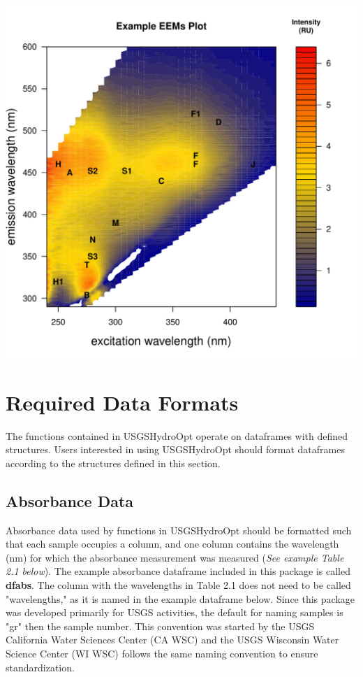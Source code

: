 \documentclass[a4paper,11pt]{article}\usepackage[]{graphicx}\usepackage[]{color}
\makeatletter
\def\maxwidth{ %
  \ifdim\Gin@nat@width>\linewidth
    \linewidth
  \else
    \Gin@nat@width
  \fi
}
\newenvironment{knitrout}{}{} %
\makeatother
\begin{document}
\begin{knitrout}
\color{fgcolor}
\includegraphics[width=\maxwidth]{figure/unnamed-chunk-3} 

\end{knitrout}

\section{Required Data Formats}
The functions contained in USGSHydroOpt operate on dataframes with defined structures. Users interested in using USGSHydroOpt should format dataframes according to the structures defined in this section.

\subsection{Absorbance Data}
Absorbance data used by functions in USGSHydroOpt should be formatted such that each sample occupies a column, and one column contains the wavelength (nm) for which the absorbance measurement was measured (\emph{See example Table 2.1 below}). The example absorbance dataframe included in this package is called \textbf{dfabs}. The column with the wavelengths in Table 2.1 does not need to be called "wavelengths," as it is named in the example dataframe below. Since this package was developed primarily for USGS activities, the default for naming samples is "gr" then the sample number. This convention was started by the USGS California Water Sciences Center (CA WSC) and the USGS Wisconsin Water Science Center (WI WSC) follows the same naming convention to ensure standardization.
\end{document}
